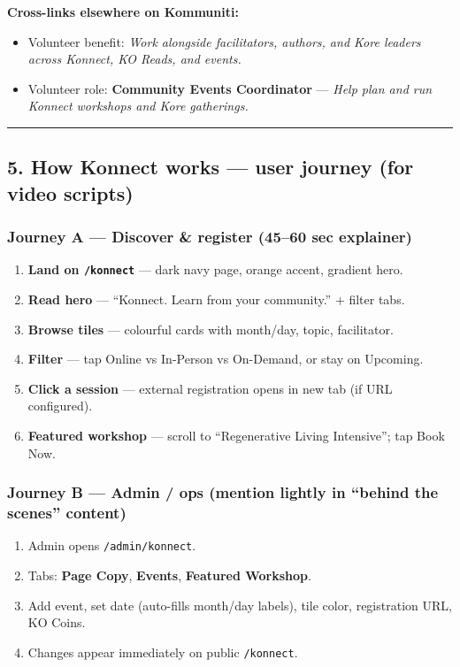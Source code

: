\documentclass[11pt,a4paper]{report}
\begin{document}
\textbf{Cross-links elsewhere on Kommuniti:}

\begin{itemize}
  \item Volunteer benefit: \textit{Work alongside facilitators, authors, and Kore leaders across Konnect, KO Reads, and events.}
  \item Volunteer role: \textbf{Community Events Coordinator} --- \textit{Help plan and run Konnect workshops and Kore gatherings.}
\end{itemize}

\medskip\hrule\medskip

\subsection{5. How Konnect works --- user journey (for video scripts)}

\subsubsection{Journey A --- Discover \& register (45--60 sec explainer)}

\begin{enumerate}
  \item \textbf{Land on \texttt{/konnect}} --- dark navy page, orange accent, gradient hero.
  \item \textbf{Read hero} --- “Konnect. Learn from your community.” + filter tabs.
  \item \textbf{Browse tiles} --- colourful cards with month/day, topic, facilitator.
  \item \textbf{Filter} --- tap Online vs In-Person vs On-Demand, or stay on Upcoming.
  \item \textbf{Click a session} --- external registration opens in new tab (if URL configured).
  \item \textbf{Featured workshop} --- scroll to “Regenerative Living Intensive”; tap Book Now.
\end{enumerate}

\subsubsection{Journey B --- Admin / ops (mention lightly in “behind the scenes” content)}

\begin{enumerate}
  \item Admin opens \texttt{/admin/konnect}.
  \item Tabs: \textbf{Page Copy}, \textbf{Events}, \textbf{Featured Workshop}.
  \item Add event, set date (auto-fills month/day labels), tile color, registration URL, KO Coins.
  \item Changes appear immediately on public \texttt{/konnect}.
\end{enumerate}
\end{document}
